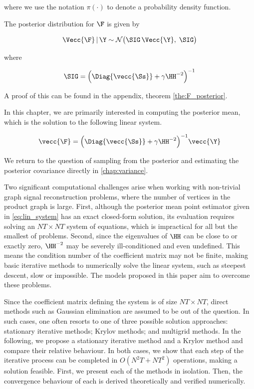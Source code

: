 where we use the notation $\pi(\cdot)$ to denote a probability density function. 

The posterior distribution for $\F$ is given by 

\begin{equation}
    \label{eq:F_post}
        \Vecc{\F} \, | \, \Y \sim \mathcal{N} \big(\SIG \, \Vecc{\Y}, \; \SIG \big)
    \end{equation}
    
    \noindent where 
    
\begin{equation}
    \label{eq:Sig_post}
        \SIG = \Big(\Diag{\vecc{\Ss}} + \gamma  \HH^{-2}\Big)^{-1}
\end{equation}

A proof of this can be found in the appendix, theorem \ref{the:F_posterior}. 



In this chapter, we are primarily interested in computing the posterior mean, which is the solution to the following linear system. 

\begin{equation}
    \label{eq:lin_system}
         \vecc{\F} = \Big(\Diag{\vecc{\Ss}} + \gamma  \HH^{-2}\Big)^{-1} \vecc{\Y}
    \end{equation}

We return to the question of sampling from the posterior and estimating the posterior covariance directly in \cref{chap:variance}. 

Two significant computational challenges arise when working with non-trivial graph signal reconstruction problems, where the number of vertices in the product graph is large. First, although the posterior mean point estimator given in \cref{eq:lin_system} has an exact closed-form solution, its evaluation requires solving an $NT \times NT$ system of equations, which is impractical for all but the smallest of problems. Second, since the eigenvalues of $\HH$ can be close to or exactly zero, $\HH^{-2}$ may be severely ill-conditioned and even undefined. This means the condition number of the coefficient matrix may not be finite, making basic iterative methods to numerically solve the linear system, such as steepest descent, slow or impossible. The models proposed in this paper aim to overcome these problems.


Since the coefficient matrix defining the system is of size $NT \times NT $, direct methods such as Gaussian elimination are assumed to be out of the question. In such cases, one often resorts to one of three possible solution approaches: stationary iterative methods; Krylov methods; and multigrid methods. In the following, we propose a stationary iterative method and a Krylov method and compare their relative behaviour. In both cases, we show that each step of the iterative process can be completed in $O(N^2T + NT^2)$ operations, making a solution feasible. First, we present each of the methods in isolation. Then, the convergence behaviour of each is derived theoretically and verified numerically.


